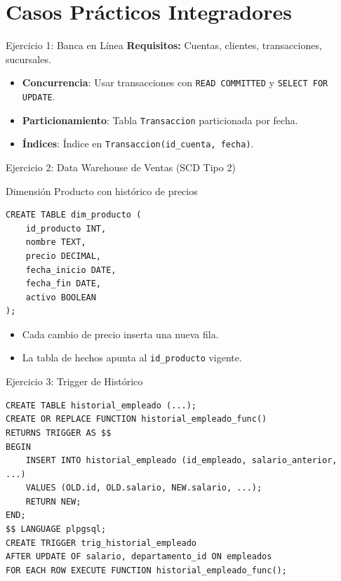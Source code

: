 \documentclass[aspectratio=169, 10pt, xcolor=table]{beamer}
\begin{document}
\section{Casos Prácticos Integradores}

\begin{frame}{Ejercicio 1: Banca en Línea}
    \textbf{Requisitos:} Cuentas, clientes, transacciones, sucursales.
    \begin{itemize}
        \item \textbf{Concurrencia}: Usar transacciones con \texttt{READ COMMITTED} y \texttt{SELECT FOR UPDATE}.
        \item \textbf{Particionamiento}: Tabla \texttt{Transaccion} particionada por fecha.
        \item \textbf{Índices}: Índice en \texttt{Transaccion(id\_cuenta, fecha)}.
    \end{itemize}
\end{frame}

\begin{frame}[fragile]{Ejercicio 2: Data Warehouse de Ventas (SCD Tipo 2)}
    \begin{block}{Dimensión Producto con histórico de precios}
\begin{verbatim}
CREATE TABLE dim_producto (
    id_producto INT,
    nombre TEXT,
    precio DECIMAL,
    fecha_inicio DATE,
    fecha_fin DATE,
    activo BOOLEAN
);
\end{verbatim}
    \end{block}
    \begin{itemize}
        \item Cada cambio de precio inserta una nueva fila.
        \item La tabla de hechos apunta al \texttt{id\_producto} vigente.
    \end{itemize}
\end{frame}

\begin{frame}[fragile]{Ejercicio 3: Trigger de Histórico}
\begin{verbatim}
CREATE TABLE historial_empleado (...);
CREATE OR REPLACE FUNCTION historial_empleado_func() 
RETURNS TRIGGER AS $$
BEGIN
    INSERT INTO historial_empleado (id_empleado, salario_anterior, ...)
    VALUES (OLD.id, OLD.salario, NEW.salario, ...);
    RETURN NEW;
END;
$$ LANGUAGE plpgsql;
CREATE TRIGGER trig_historial_empleado
AFTER UPDATE OF salario, departamento_id ON empleados
FOR EACH ROW EXECUTE FUNCTION historial_empleado_func();
\end{verbatim}
\end{frame}
\end{document}
